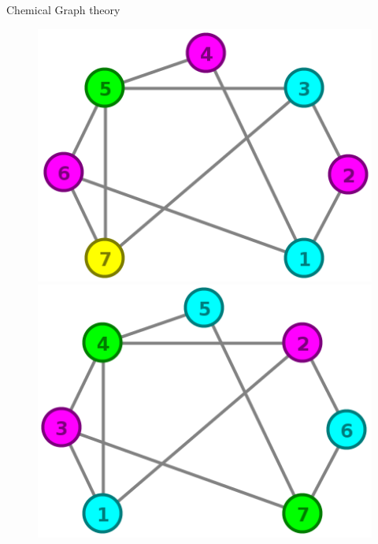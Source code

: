 \documentclass[12pt, oneside]{book}
\begin{document}
\cite{2014:15}
\cite{2014:16}

Chemical Graph theory
\cite{2015:05,2015:06,2015:07,2015:08}


\begin{figure}
\centering
   \includegraphics[width=0.45\linewidth]{bad_order_color}
   \hfill
   \includegraphics[width=0.45\linewidth]{good_order_color}
\end{figure}
\end{document}
